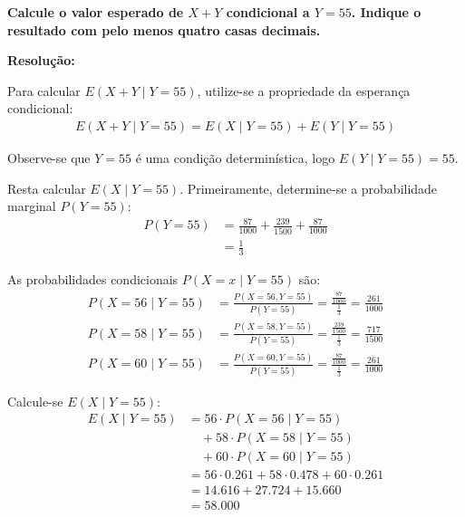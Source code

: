 \documentclass[a4paper,12pt]{article}
\begin{document}
\begin{enumerate}
  \textbf{Calcule o valor esperado de \( X + Y \) condicional a \( Y = 55 \). Indique o resultado com pelo menos quatro casas decimais.}

  \vspace{0.3cm}

  \begin{mdframed}[backgroundcolor=gray!10, linewidth=0pt, innertopmargin=10pt, innerbottommargin=10pt]
  \textbf{Resolução:}
  
  Para calcular \( E(X + Y \mid Y = 55) \), utilize-se a propriedade da esperança condicional:
  \begin{align*}
    E(X + Y \mid Y = 55) = E(X \mid Y = 55) + E(Y \mid Y = 55)
  \end{align*}

  Observe-se que \( Y = 55 \) é uma condição determinística, logo \( E(Y \mid Y = 55) = 55 \). 
  
  Resta calcular \( E(X \mid Y = 55) \). Primeiramente, determine-se a probabilidade marginal \( P(Y = 55) \):
  \begin{align*}
    P(Y = 55) &= \frac{87}{1000} + \frac{239}{1500} + \frac{87}{1000} \\
    &= \frac{1}{3}
  \end{align*}

  As probabilidades condicionais \( P(X = x \mid Y = 55) \) são:
  \begin{align*}
    P(X = 56 \mid Y = 55) &= \frac{P(X = 56, Y = 55)}{P(Y = 55)} = 
    \frac{\frac{87}{1000}}{\frac{1}{3}} = \frac{261}{1000} \\
    P(X = 58 \mid Y = 55) &= \frac{P(X = 58, Y = 55)}{P(Y = 55)} = 
    \frac{\frac{239}{1500}}{\frac{1}{3}} = \frac{717}{1500} \\
    P(X = 60 \mid Y = 55) &= \frac{P(X = 60, Y = 55)}{P(Y = 55)} = 
    \frac{\frac{87}{1000}}{\frac{1}{3}} = \frac{261}{1000}
  \end{align*}

  Calcule-se \( E(X \mid Y = 55) \):
  \begin{align*}
    E(X \mid Y = 55) &= 56 \cdot P(X = 56 \mid Y = 55) \\ 
    &\quad + 58 \cdot P(X = 58 \mid Y = 55) \\
    &\quad + 60 \cdot P(X = 60 \mid Y = 55) \\
    &= 56 \cdot 0.261 + 58 \cdot 0.478 + 60 \cdot 0.261 \\
    &= 14.616 + 27.724 + 15.660 \\
    &= 58.000
  \end{align*}


\end{mdframed}
\end{enumerate}
\end{document}
